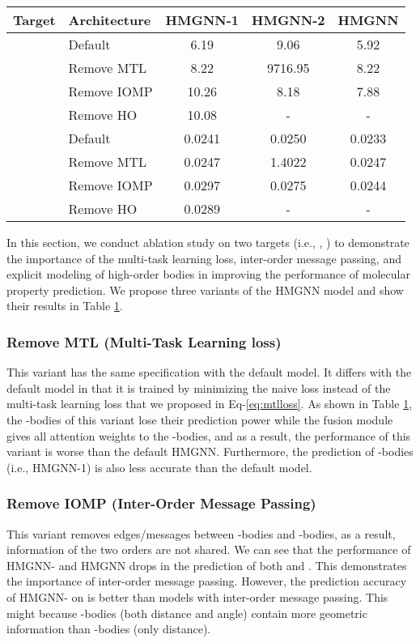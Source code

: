 \documentclass[conference]{IEEEtran}
\begin{document}
\begin{table}[t]
\begin{center}
\begin{tabular}{llccc}
\toprule
Target & Architecture & HMGNN-1 & HMGNN-2 & HMGNN \\
\midrule
\multirow{4}{*}{} & Default & 6.19 & 9.06 & 5.92 \\
& Remove MTL & 8.22 & 9716.95 & 8.22 \\
& Remove IOMP & 10.26 & 8.18 & 7.88 \\
& Remove HO & 10.08 & - &  - \\
\midrule
\multirow{4}{*}{} & Default & 0.0241 & 0.0250 & 0.0233 \\
& Remove MTL & 0.0247 & 1.4022 & 0.0247\\
& Remove IOMP & 0.0297 & 0.0275 & 0.0244 \\
& Remove HO & 0.0289 & - &  - \\
\bottomrule
\end{tabular}
\label{Table:mtl}
\end{center}
\end{table}

In this section, we conduct ablation study on two targets (i.e., , ) to demonstrate the importance of the multi-task learning loss, inter-order message passing, and explicit modeling of high-order bodies in improving the performance of molecular property prediction. We propose three variants of the HMGNN model and show their results in Table \ref{Table:mtl}.

\subsubsection{Remove MTL (Multi-Task Learning loss)} This variant has the same specification with the default model. It differs with the default model in that it is trained by minimizing the naive loss  instead of the multi-task learning loss that we proposed in Eq-\ref{eq:mtlloss}. As shown in Table \ref{Table:mtl}, the -bodies of this variant lose their prediction power while the fusion module gives all attention weights to the -bodies, and as a result, the performance of this variant is worse than the default HMGNN. Furthermore, the prediction of -bodies (i.e., HMGNN-1) is also less accurate than the default model. 

\subsubsection{Remove IOMP (Inter-Order Message Passing)} This variant removes edges/messages between -bodies and -bodies, as a result, information of the two orders are not shared. We can see that the performance of HMGNN- and HMGNN drops in the prediction of both  and . This demonstrates the importance of inter-order message passing. However, the prediction accuracy of HMGNN- on  is better than models with inter-order message passing. This might because -bodies (both distance and angle) contain more geometric information than -bodies (only distance). 
\end{document}
